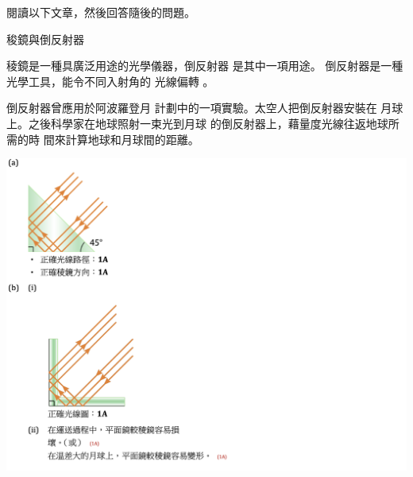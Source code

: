 {

    閱讀以下文章，然後回答隨後的問題。
    \begin{tcolorbox}
        \begin{center}
            稄鏡與倒反射器
        \end{center}
        稜鏡是一種具廣泛用途的光學儀器，倒反射器 是其中一項用途。 倒反射器是一種光學工具，能令不同入射角的 光線偏轉 。
        \par 倒反射器曾應用於阿波羅登月 計劃中的一項實驗。太空人把倒反射器安裝在 月球上。之後科學家在地球照射一束光到月球 的倒反射器上，藉量度光線往返地球所需的時 間來計算地球和月球間的距離。
    \end{tcolorbox}
}{
    \par{\par\centering\includegraphics[width=\textwidth]{./img/ch2_refraction_lq_2024-05-18-17-33-58.png}\par}
}